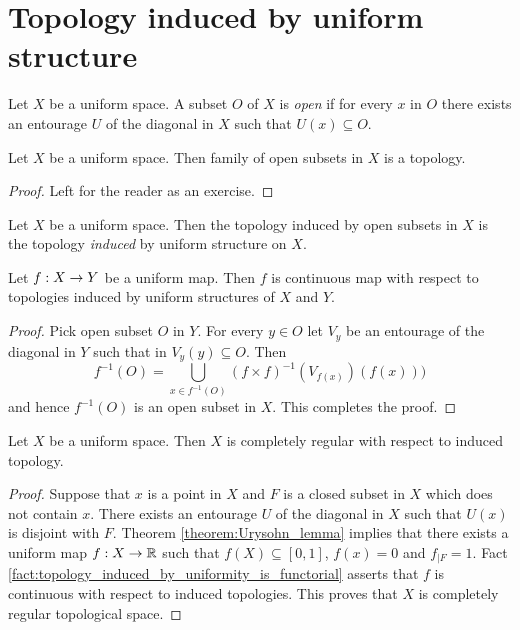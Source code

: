 \documentclass[10pt]{amsart}
\begin{document}
\section{Topology induced by uniform structure}

\begin{definition}
	Let $X$ be a uniform space. A subset $O$ of $X$ is \textit{open} if for every $x$ in $O$ there exists an entourage $U$ of the diagonal in $X$ such that $U(x) \subseteq O$.
\end{definition}

\begin{fact}\label{fact:topology_induced_by_uniform_structure}
	Let $X$ be a uniform space. Then family of open subsets in $X$ is a topology.
\end{fact}
\begin{proof}
	Left for the reader as an exercise.
\end{proof}

\begin{definition}
	Let $X$ be a uniform space. Then the topology induced by open subsets in $X$ is the topology \textit{induced} by uniform structure on $X$.
\end{definition}

\begin{fact}\label{fact:topology_induced_by_uniformity_is_functorial}
	Let $f:X \rightarrow Y$ be a uniform map. Then $f$ is continuous map with respect to topologies induced by uniform structures of $X$ and $Y$.
\end{fact}
\begin{proof}
	Pick open subset $O$ in $Y$. For every $y \in O$ let $V_y$ be an entourage of the diagonal in $Y$ such that in $V_y(y) \subseteq O$. Then
	$$f^{-1}(O) = \bigcup_{x \in f^{-1}(O)}\left(f\times f\right)^{-1}(V_{f(x)})\left(f(x)\right))$$
	and hence $f^{-1}(O)$ is an open subset in $X$. This completes the proof.
\end{proof}

\begin{corollary}\label{corollary:uniform_spaces_are_completely_regular}
	Let $X$ be a uniform space. Then $X$ is completely regular with respect to induced topology.
\end{corollary}
\begin{proof}
	Suppose that $x$ is a point in $X$ and $F$ is a closed subset in $X$ which does not contain $x$. There exists an entourage $U$ of the diagonal in $X$ such that $U(x)$ is disjoint with $F$. Theorem \ref{theorem:Urysohn_lemma} implies that there exists a uniform map $f:X\rightarrow {\mathbb R}$ such that $f(X) \subseteq [0,1]$, $f(x) = 0$ and $f_{\mid F} = 1$. Fact \ref{fact:topology_induced_by_uniformity_is_functorial} asserts that $f$ is continuous with respect to induced topologies. This proves that $X$ is completely regular topological space.
\end{proof}
\end{document}
